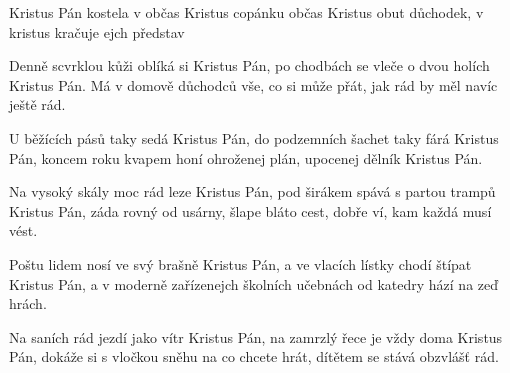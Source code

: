 \begin{TEXT}{Kristus Pán}
\SLOKA	{} kostela v  občas  Kristus \NL
	 copánku  občas  Kristus  \NL
	 obut  důchodek,  v kristus \NL
	kračuje ejch představ 

\SLOKA	Denně scvrklou kůži oblíká si Kristus Pán,\NL
	po chodbách se vleče o dvou holích Kristus Pán.\NL
	Má v domově důchodců vše, co si může přát, \NL
	jak rád by měl navíc ještě rád.

\SLOKA	U běžících pásů taky sedá Kristus Pán,\NL
	do podzemních šachet taky fárá Kristus Pán,\NL
	koncem roku kvapem honí ohroženej plán, \NL
	upocenej dělník Kristus Pán.

\SLOKA	Na vysoký skály moc rád leze Kristus Pán,\NL
	pod širákem spává s partou trampů Kristus Pán,\NL
	záda rovný od usárny, šlape bláto cest,\NL
	dobře ví, kam každá musí vést.

\SLOKA	Poštu lidem nosí ve svý brašně Kristus Pán,\NL
	a ve vlacích lístky chodí štípat Kristus Pán, \NL
	a v moderně zařízenejch školních učebnách\NL
	od katedry hází na zeď hrách.

\SLOKA	Na saních rád jezdí jako vítr Kristus Pán,\NL
	na zamrzlý řece je vždy doma Kristus Pán,\NL
	dokáže si s vločkou sněhu na co chcete hrát,\NL
	dítětem se stává obzvlášť rád.
\end{TEXT}

